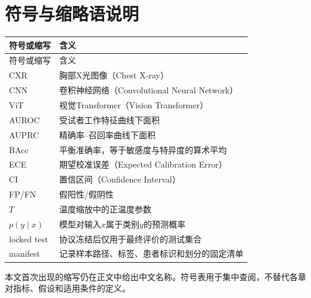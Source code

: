 \chapter*{符号与缩略语说明}

\begin{longtable}{p{}p{}}
\toprule
符号或缩写 & 含义 \\
\midrule
\endfirsthead
\toprule
符号或缩写 & 含义 \\
\midrule
\endhead
CXR & 胸部X光图像（Chest X-ray） \\
CNN & 卷积神经网络（Convolutional Neural Network） \\
ViT & 视觉Transformer（Vision Transformer） \\
AUROC & 受试者工作特征曲线下面积 \\
AUPRC & 精确率--召回率曲线下面积 \\
BAcc & 平衡准确率，等于敏感度与特异度的算术平均 \\
ECE & 期望校准误差（Expected Calibration Error） \\
CI & 置信区间（Confidence Interval） \\
FP/FN & 假阳性/假阴性 \\
$T$ & 温度缩放中的正温度参数 \\
$p(y\mid x)$ & 模型对输入$x$属于类别$y$的预测概率 \\
locked test & 协议冻结后仅用于最终评价的测试集合 \\
manifest & 记录样本路径、标签、患者标识和划分的固定清单 \\
\bottomrule
\end{longtable}

本文首次出现的缩写仍在正文中给出中文名称。符号表用于集中查阅，不替代各章对指标、假设和适用条件的定义。
